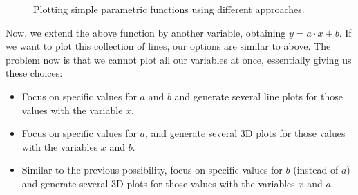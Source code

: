 \documentclass[a4paper, twoside]{article}
\begin{document}
\begin{figure}[ht]
  \centering
  \caption{Plotting simple parametric functions using different approaches.}
  \label{fig:simple-parametric-functions}
\end{figure}

Now, we extend the above function by another variable, obtaining $y = a \cdot x + b$.
If we want to plot this collection of lines, our options are similar to above.
The problem now is that we cannot plot all our variables at once, essentially giving us these choices:

\begin{itemize}
\item Focus on specific values for $a$ and $b$ and generate several line plots for those values with the variable $x$.
\item Focus on specific values for $a$, and generate several 3D plots for those values with the variables $x$ and $b$.
\item Similar to the previous possibility, focus on specific values for $b$ (instead of $a$) and generate several 3D plots for those values with the variables $x$ and $a$.
\end{itemize}
\end{document}
